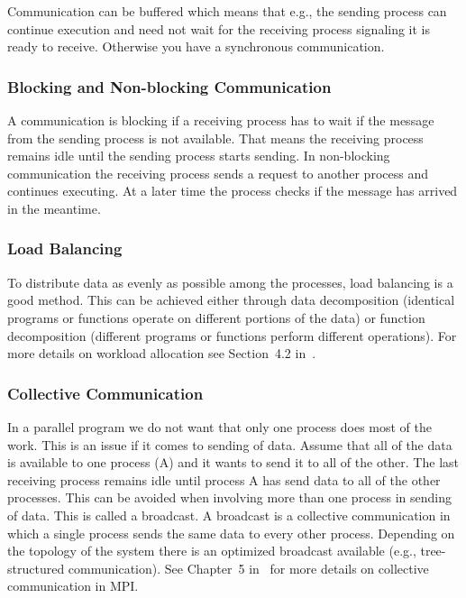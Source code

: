 Communication can be buffered which means that e.g., the sending
process can continue execution and need not wait for the receiving
process signaling it is ready to receive. Otherwise you have a synchronous
communication. 

\subsubsection{Blocking and Non-blocking Communication}

A communication is blocking if a receiving process has to wait if the
message from the sending process is not available. That means the
receiving process remains idle until the sending process starts
sending. In non-blocking communication the receiving process sends a
request to another process and continues executing. At a later time
the process checks if the message has arrived in the meantime. 

\subsubsection{Load Balancing}

To distribute data as evenly as possible among the processes, load
balancing is a good method. This can be achieved either through data
decomposition (identical programs or functions operate on different
portions of the data) or function decomposition (different programs or
functions perform different operations). For more details on workload
allocation see Section~4.2 in~\cite{geist94pvm}.

\subsubsection{Collective Communication}

In a parallel program we do not want that only one process does most of
the work. This is an issue if it comes to sending of data. Assume that
all of the data is available to one process (A) and it wants to send it to
all of the other. The last receiving process remains idle until
process A has send data to all of the other processes. This can be
avoided when involving more than one process in sending of data. This
is called a broadcast.
A broadcast is a collective communication in which a single process
sends the same data to every other process. Depending on the topology
of the system there is an optimized broadcast available
(e.g., tree-structured communication). See Chapter~5
in~\cite{pacheco97mpi} for more details on collective communication in
MPI.

